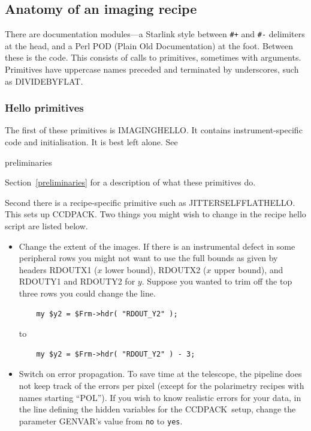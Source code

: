 \documentclass[twoside,11pt]{article}
\newcommand{\htmlref}[2]{#1}
\newenvironment{latexonly}{}{}
\newcommand{\xlabel}[1]{}
\renewcommand{\_}{\texttt{\symbol{95}}}
\newcommand{\CCDPACK}{{\footnotesize CCDPACK}}
\begin{document}
\subsection{\xlabel{anatomy_of_an_imaging_recipe}Anatomy of an imaging recipe}

There are documentation modules---a Starlink style between \verb/#+/ and
\verb/#-/ delimiters at the head, and a Perl POD (Plain Old
Documentation) at the foot.  Between these is the code.  This consists
of calls to primitives, sometimes with arguments.  Primitives have
uppercase names preceded and terminated by underscores, such as
\_DIVIDE\_BY\_FLAT\_.

\subsubsection{\xlabel{hello_primitives}Hello primitives}

The first of these primitives is \_IMAGING\_HELLO\_.
It contains instrument-specific code and initialisation.  It is
best left alone.  See 
\begin{htmlonly}
\htmlref{preliminaries}{preliminaries}
\end{htmlonly}
\begin{latexonly}
Section~\ref{preliminaries}
\end{latexonly}
for a description of what these primitives do.

Second there is a recipe-specific primitive such as
\_JITTER\_SELF\_FLAT\_HELLO\_.  This sets up \CCDPACK.  Two things you
might wish to change in the recipe hello script are listed below.

\begin{itemize}

\item Change the extent of the images.  If there is an instrumental defect
in some peripheral rows you might not want to use the full bounds
as given by headers RDOUT\_X1 ($x$ lower bound), RDOUT\_X2
($x$ upper bound), and RDOUT\_Y1 and RDOUT\_Y2 for $y$.  Suppose you
wanted to trim off the top three rows you could change the line.

\begin{verbatim}
    my $y2 = $Frm->hdr( "RDOUT_Y2" );
\end{verbatim}
to
\begin{verbatim}
    my $y2 = $Frm->hdr( "RDOUT_Y2" ) - 3;
\end{verbatim}

\item Switch on error propagation.  To save time at the telescope, the pipeline
does not keep track of the errors per pixel (except for the
polarimetry recipes with names starting ``POL'').  If you wish to know
realistic errors for your data, in the line defining the hidden
variables for the \CCDPACK\ setup, change the parameter GENVAR's
value from {\tt{no}} to {\tt{yes}}.

\end{itemize}
\end{document}
